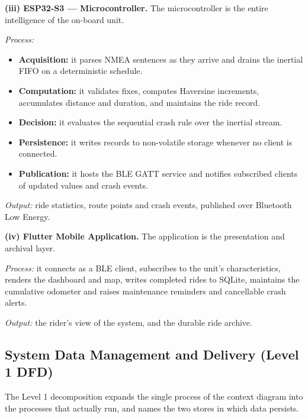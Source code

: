 \documentclass[12pt,a4paper,oneside]{report}
\begin{document}
\vspace{0.5em}
\noindent\textbf{(iii) ESP32-S3 --- Microcontroller.} The microcontroller is the entire
intelligence of the on-board unit.

\noindent\emph{Process:}
\begin{itemize}[leftmargin=*,itemsep=0.28em,topsep=0.4em]
\item \textbf{Acquisition:} it parses NMEA sentences as they arrive and drains the inertial
FIFO on a deterministic schedule.
\item \textbf{Computation:} it validates fixes, computes Haversine increments, accumulates
distance and duration, and maintains the ride record.
\item \textbf{Decision:} it evaluates the sequential crash rule over the inertial stream.
\item \textbf{Persistence:} it writes records to non-volatile storage whenever no client is
connected.
\item \textbf{Publication:} it hosts the BLE GATT service and notifies subscribed clients of
updated values and crash events.
\end{itemize}
\noindent\emph{Output:} ride statistics, route points and crash events, published over
Bluetooth Low Energy.

\vspace{0.5em}
\noindent\textbf{(iv) Flutter Mobile Application.} The application is the presentation and
archival layer.

\noindent\emph{Process:} it connects as a BLE client, subscribes to the unit's
characteristics, renders the dashboard and map, writes completed rides to SQLite, maintains
the cumulative odometer and raises maintenance reminders and cancellable crash alerts.

\noindent\emph{Output:} the rider's view of the system, and the durable ride archive.

\subsection{System Data Management and Delivery (Level 1 DFD)}

The Level 1 decomposition expands the single process of the context diagram into the
processes that actually run, and names the two stores in which data persists.
\end{document}
